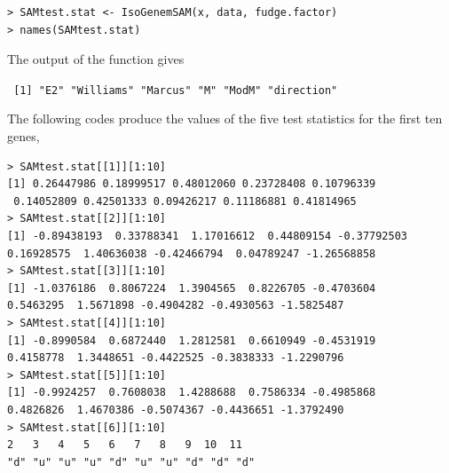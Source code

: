 \begin{center}
\begin{boxit}
\begin{verbatim}
> SAMtest.stat <- IsoGenemSAM(x, data, fudge.factor)
> names(SAMtest.stat)
\end{verbatim}
\end{boxit}
\end{center}
The output of the function gives
\begin{center}
\begin{boxit}
\texttt{
[1] "E2"        "Williams"  "Marcus"    "M"         "ModM"      "direction"
}
\end{boxit}
\end{center}

The following codes produce the values of the five test statistics for the first ten genes,

\begin{center}
\begin{boxit}
{ \small
\begin{verbatim}
> SAMtest.stat[[1]][1:10]
[1] 0.26447986 0.18999517 0.48012060 0.23728408 0.10796339
 0.14052809 0.42501333 0.09426217 0.11186881 0.41814965
> SAMtest.stat[[2]][1:10]
[1] -0.89438193  0.33788341  1.17016612  0.44809154 -0.37792503
0.16928575  1.40636038 -0.42466794  0.04789247 -1.26568858
> SAMtest.stat[[3]][1:10]
[1] -1.0376186  0.8067224  1.3904565  0.8226705 -0.4703604
0.5463295  1.5671898 -0.4904282 -0.4930563 -1.5825487
> SAMtest.stat[[4]][1:10]
[1] -0.8990584  0.6872440  1.2812581  0.6610949 -0.4531919
0.4158778  1.3448651 -0.4422525 -0.3838333 -1.2290796
> SAMtest.stat[[5]][1:10]
[1] -0.9924257  0.7608038  1.4288688  0.7586334 -0.4985868
0.4826826  1.4670386 -0.5074367 -0.4436651 -1.3792490
> SAMtest.stat[[6]][1:10]
2   3   4   5   6   7   8   9  10  11
"d" "u" "u" "u" "d" "u" "u" "d" "d" "d"
\end{verbatim}
}
\end{boxit}
\end{center}


